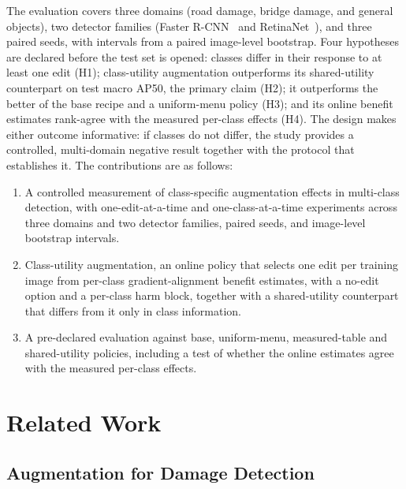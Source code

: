 \documentclass[conference]{IEEEtran}
\begin{document}
The evaluation covers three domains (road damage, bridge damage, and general objects), two detector families (Faster R-CNN~\cite{ren2017faster} and RetinaNet~\cite{lin2017focal}), and three paired seeds, with intervals from a paired image-level bootstrap. Four hypotheses are declared before the test set is opened: classes differ in their response to at least one edit (H1); class-utility augmentation outperforms its shared-utility counterpart on test macro AP50, the primary claim (H2); it outperforms the better of the base recipe and a uniform-menu policy (H3); and its online benefit estimates rank-agree with the measured per-class effects (H4). The design makes either outcome informative: if classes do not differ, the study provides a controlled, multi-domain negative result together with the protocol that establishes it. The contributions are as follows:

\begin{enumerate}
    \item A controlled measurement of class-specific augmentation effects in multi-class detection, with one-edit-at-a-time and one-class-at-a-time experiments across three domains and two detector families, paired seeds, and image-level bootstrap intervals.
    \item Class-utility augmentation, an online policy that selects one edit per training image from per-class gradient-alignment benefit estimates, with a no-edit option and a per-class harm block, together with a shared-utility counterpart that differs from it only in class information.
    \item A pre-declared evaluation against base, uniform-menu, measured-table and shared-utility policies, including a test of whether the online estimates agree with the measured per-class effects.
\end{enumerate}

\section{Related Work}
\label{sec:related}

\subsection{Augmentation for Damage Detection}
\end{document}
